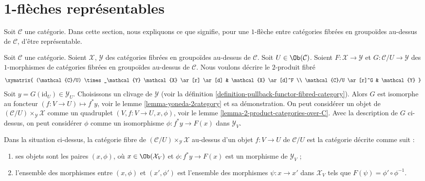 \section{1-flèches représentables}
\label{section-representable-1-morphisms}

\noindent
Soit $\mathcal{C}$ une catégorie.
Dans cette section, nous expliquons ce que signifie, pour une $1$-flèche
entre catégories fibrées en groupoïdes au-dessus de $\mathcal{C}$,
d'être représentable.

\medskip\noindent
Soit $\mathcal{C}$ une catégorie.
Soient $\mathcal{X}$, $\mathcal{Y}$ des catégories fibrées en groupoïdes
au-dessus de $\mathcal{C}$.
Soit $U \in \Ob(\mathcal{C})$.
Soient $F : \mathcal{X} \to \mathcal{Y}$ et
$G : \mathcal{C}/U \to \mathcal{Y}$ des $1$-morphismes de catégories
fibrées en groupoïdes au-dessus de $\mathcal{C}$.
Nous voulons décrire
le $2$-produit fibré
$$
\xymatrix{
(\mathcal{C}/U) \times_\mathcal{Y} \mathcal{X} \ar[r] \ar[d] &
\mathcal{X} \ar[d]^F \\
\mathcal{C}/U \ar[r]^G &
\mathcal{Y}
}
$$
Soit $y = G(\text{id}_U) \in \mathcal{Y}_U$.
Choisissons un clivage de $\mathcal{Y}$
(voir la définition \ref{definition-pullback-functor-fibred-category}).
Alors $G$ est isomorphe au foncteur $(f : V \to U) \mapsto f^*y$,
voir le lemme \ref{lemma-yoneda-2category} et sa démonstration.
On peut considérer un objet de
$(\mathcal{C}/U) \times_\mathcal{Y} \mathcal{X}$
comme un quadruplet $(V, f : V \to U, x, \phi)$, voir le
lemme \ref{lemma-2-product-categories-over-C}.
Avec la description de $G$ ci-dessus, on peut considérer $\phi$ comme
un isomorphisme $\phi : f^*y \to F(x)$ dans $\mathcal{Y}_V$.

\begin{lemma}
\label{lemma-identify-fibre-product}
Dans la situation ci-dessus, la catégorie fibre de
$(\mathcal{C}/U) \times_\mathcal{Y} \mathcal{X}$ au-dessus
d'un objet $f : V \to U$ de $\mathcal{C}/U$
est la catégorie décrite comme suit :
\begin{enumerate}
\item ses objets sont les paires $(x, \phi)$,
où $x \in \Ob(\mathcal{X}_V)$ et
$\phi : f^*y \to F(x)$ est un morphisme de $\mathcal{Y}_V$ ;
\item l'ensemble des morphismes entre $(x, \phi)$ et $(x', \phi')$
est l'ensemble des morphismes $\psi : x \to x'$ dans $\mathcal{X}_V$
tels que $F(\psi) = \phi' \circ \phi^{-1}$.
\end{enumerate}
\end{lemma}

